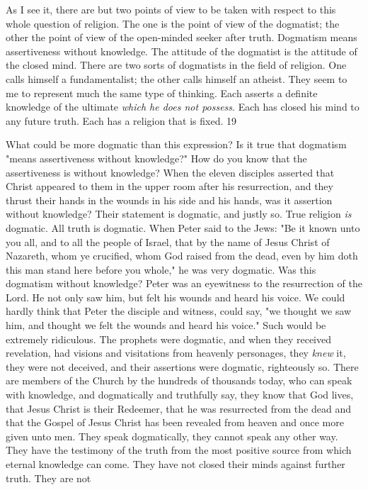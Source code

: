 As I see it, there are but two points of view to be taken with respect to this whole question of
religion. The one is the point of view of the dogmatist; the other the point of view of the
open-minded seeker after truth. Dogmatism means assertiveness without knowledge. The
attitude of the dogmatist is the attitude of the closed mind. There are two sorts of dogmatists
in the field of religion. One calls himself a fundamentalist; the other calls himself an atheist.
They seem to me to represent much the same type of thinking. Each asserts a definite
knowledge of the ultimate \textit{which he does not possess}. Each has closed his mind to any future
truth. Each has a religion that is fixed. 19

What could be more dogmatic than this expression? Is it true that dogmatism "means
assertiveness without knowledge?" How do you know that the assertiveness is without
knowledge? When the eleven disciples asserted that Christ appeared to them in the upper
room after his resurrection, and they thrust their hands in the wounds in his side and his
hands, was it assertion without knowledge? Their statement is dogmatic, and justly so. True
religion \textit{is} dogmatic. All truth is dogmatic. When Peter said to the Jews: "Be it known unto
you all, and to all the people of Israel, that by the name of Jesus Christ of Nazareth, whom ye
crucified, whom God raised from the dead, even by him doth this man stand here before you
whole," he was very dogmatic. Was this dogmatism without knowledge? Peter was an
eyewitness to the resurrection of the Lord. He not only saw him, but felt his wounds and
heard his voice. We could hardly think that Peter the disciple and witness, could say, "we
thought we saw him, and thought we felt the wounds and heard his voice." Such would be
extremely ridiculous. The prophets were dogmatic, and when they received revelation, had
visions and visitations from heavenly personages, they \textit{knew} it, they were not deceived, and
their assertions were dogmatic, righteously so. There are members of the Church by the
hundreds of thousands today, who can speak with knowledge, and dogmatically and
truthfully say, they know that God lives, that Jesus Christ is their Redeemer, that he was
resurrected from the dead and that the Gospel of Jesus Christ has been revealed from heaven
and once more given unto men. They speak dogmatically, they cannot speak any other way.
They have the testimony of the truth from the most positive source from which eternal
knowledge can come. They have not closed their minds against further truth. They are not
